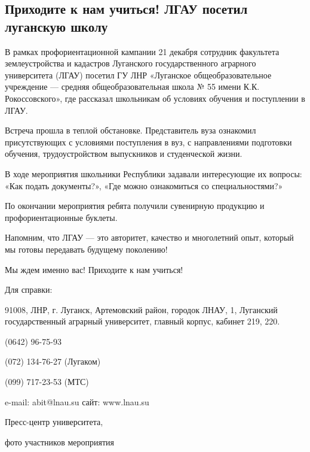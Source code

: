  
 
 
 
 
\subsection{Приходите к нам учиться! ЛГАУ посетил луганскую школу}
\label{sec:22_12_2021.stz.edu.lnr.lgau.1.shkola}



В рамках профориентационной кампании 21 декабря сотрудник факультета
землеустройства и кадастров Луганского государственного аграрного университета
(ЛГАУ) посетил ГУ ЛНР «Луганское общеобразовательное учреждение — средняя
общеобразовательная школа № 55 имени К.К. Рокоссовского»,  где рассказал
школьникам об условиях обучения и поступлении в ЛГАУ.

Встреча прошла в теплой обстановке. Представитель вуза ознакомил присутствующих
с условиями поступления в вуз, с направлениями подготовки обучения,
трудоустройством выпускников и студенческой жизни.


В ходе мероприятия школьники Республики задавали интересующие их вопросы: «Как
подать документы?», «Где можно ознакомиться со специальностями?»

По окончании мероприятия ребята получили сувенирную продукцию и
профориентационные буклеты.

Напомним, что ЛГАУ — это авторитет, качество и многолетний опыт, который мы
готовы передавать будущему поколению!

Мы ждем именно вас! Приходите к нам учиться!

Для справки:

91008, ЛНР, г. Луганск, Артемовский район, городок ЛНАУ, 1, Луганский
государственный аграрный университет, главный корпус, кабинет 219, 220.

(0642) 96-75-93

(072) 134-76-27 (Лугаком)

(099) 717-23-53 (МТС)

e-mail: abit@lnau.su
сайт: www.lnau.su

Пресс-центр университета,

фото участников мероприятия
